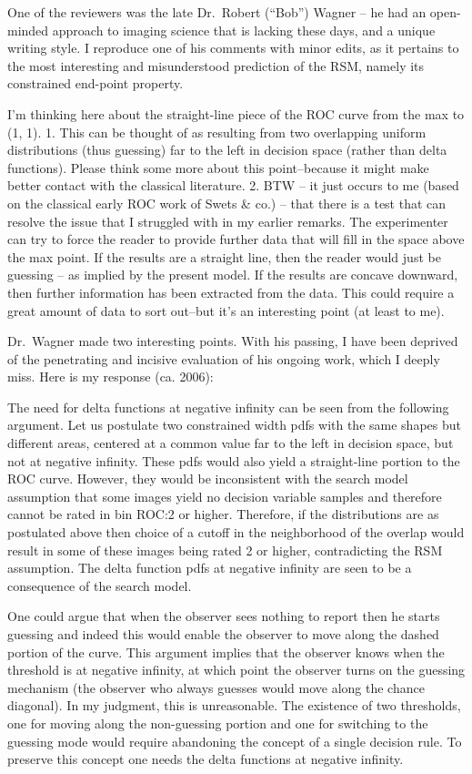 \documentclass[
]{book}
\begin{document}
One of the reviewers was the late Dr.~Robert (``Bob'') Wagner -- he had an open-minded approach to imaging science that is lacking these days, and a unique writing style. I reproduce one of his comments with minor edits, as it pertains to the most interesting and misunderstood prediction of the RSM, namely its constrained end-point property.

I'm thinking here about the straight-line piece of the ROC curve from the max to (1, 1).
1. This can be thought of as resulting from two overlapping uniform distributions (thus guessing) far to the left in decision space (rather than delta functions). Please think some more about this point--because it might make better contact with the classical literature.
2. BTW -- it just occurs to me (based on the classical early ROC work of Swets \& co.) -- that there is a test that can resolve the issue that I struggled with in my earlier remarks. The experimenter can try to force the reader to provide further data that will fill in the space above the max point. If the results are a straight line, then the reader would just be guessing -- as implied by the present model. If the results are concave downward, then further information has been extracted from the data. This could require a great amount of data to sort out--but it's an interesting point (at least to me).

Dr.~Wagner made two interesting points. With his passing, I have been deprived of the penetrating and incisive evaluation of his ongoing work, which I deeply miss. Here is my response (ca. 2006):

The need for delta functions at negative infinity can be seen from the following argument. Let us postulate two constrained width pdfs with the same shapes but different areas, centered at a common value far to the left in decision space, but not at negative infinity. These pdfs would also yield a straight-line portion to the ROC curve. However, they would be inconsistent with the search model assumption that some images yield no decision variable samples and therefore cannot be rated in bin ROC:2 or higher. Therefore, if the distributions are as postulated above then choice of a cutoff in the neighborhood of the overlap would result in some of these images being rated 2 or higher, contradicting the RSM assumption. The delta function pdfs at negative infinity are seen to be a consequence of the search model.

One could argue that when the observer sees nothing to report then he starts guessing and indeed this would enable the observer to move along the dashed portion of the curve. This argument implies that the observer knows when the threshold is at negative infinity, at which point the observer turns on the guessing mechanism (the observer who always guesses would move along the chance diagonal). In my judgment, this is unreasonable. The existence of two thresholds, one for moving along the non-guessing portion and one for switching to the guessing mode would require abandoning the concept of a single decision rule. To preserve this concept one needs the delta functions at negative infinity.
\end{document}
